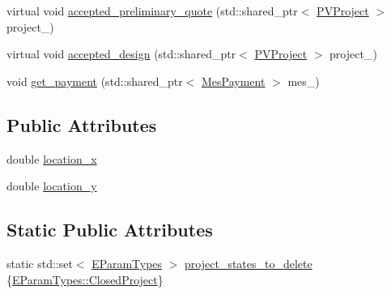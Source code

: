 {\bf }\par
\begin{DoxyCompactItemize}
\item 
virtual void \hyperlink{classsolar__core_1_1_s_e_i_ad683e480828c042d311a18cefbf2e95d}{accepted\+\_\+preliminary\+\_\+quote} (std\+::shared\+\_\+ptr$<$ \hyperlink{classsolar__core_1_1_p_v_project}{P\+V\+Project} $>$ project\+\_\+)
\end{DoxyCompactItemize}

{\bf }\par
\begin{DoxyCompactItemize}
\item 
virtual void \hyperlink{classsolar__core_1_1_s_e_i_a007004337169bac4c67b66e37ca89767}{accepted\+\_\+design} (std\+::shared\+\_\+ptr$<$ \hyperlink{classsolar__core_1_1_p_v_project}{P\+V\+Project} $>$ project\+\_\+)
\end{DoxyCompactItemize}

{\bf }\par
\begin{DoxyCompactItemize}
\item 
void \hyperlink{classsolar__core_1_1_s_e_i_a7f24aa13f3d62ec8890f526e12a3351c}{get\+\_\+payment} (std\+::shared\+\_\+ptr$<$ \hyperlink{classsolar__core_1_1_mes_payment}{Mes\+Payment} $>$ mes\+\_\+)
\end{DoxyCompactItemize}

\subsection*{Public Attributes}
{\bf }\par
\begin{DoxyCompactItemize}
\item 
double \hyperlink{classsolar__core_1_1_s_e_i_a3de17f788667889770edaf7dc0fc054d}{location\+\_\+x}
\item 
double \hyperlink{classsolar__core_1_1_s_e_i_a5fc331197d08788392c3af1903f25763}{location\+\_\+y}
\end{DoxyCompactItemize}

\subsection*{Static Public Attributes}
{\bf }\par
\begin{DoxyCompactItemize}
\item 
static std\+::set$<$ \hyperlink{namespacesolar__core_aa1147341e5ef7a40d68d1bd68e149362}{E\+Param\+Types} $>$ \hyperlink{classsolar__core_1_1_s_e_i_a41711b0f344d6f29ea48dbcdb08b9c4e}{project\+\_\+states\+\_\+to\+\_\+delete} \{\hyperlink{namespacesolar__core_aa1147341e5ef7a40d68d1bd68e149362a36011ab25e125345f76caf5e8f027175}{E\+Param\+Types\+::\+Closed\+Project}\}
\end{DoxyCompactItemize}

